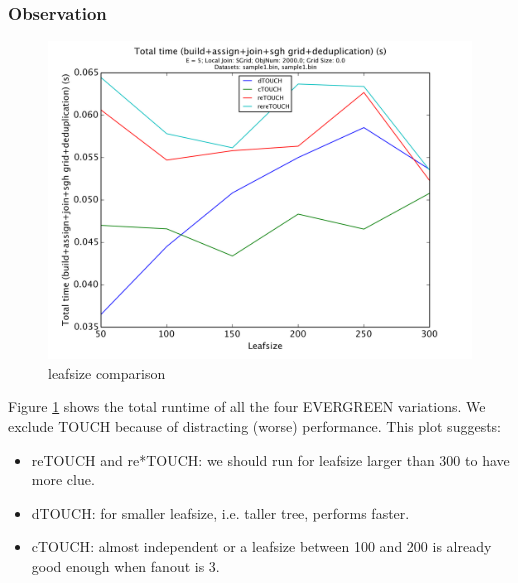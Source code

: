 \documentclass{sig-alternate}
\newcommand{\fref}[1]{Figure \ref{#1}}
\newcommand{\SJ}{TOUCH}
\newcommand{\newSJ}{EVERGREEN}
\newcommand{\dSJ}{dTOUCH}
\newcommand{\cSJ}{cTOUCH}
\newcommand{\reSJ}{reTOUCH}
\newcommand{\rereSJ}{re*TOUCH}
\begin{document}
\subsubsection{Observation}

\begin{figure}[htb]
    \begin{center}
        \includegraphics[width=\columnwidth]{leafsize/total}
        \caption{leafsize comparison}
        \label{fig:leafsize:time}
      \end{center}
\end{figure}

\fref{fig:leafsize:time} shows the total runtime of all the four {\newSJ} variations. We exclude {\SJ} because of distracting (worse) performance. This plot suggests:
\begin{itemize}
\item {\reSJ} and {\rereSJ}: we should run for leafsize larger than 300 to have more clue.
\item {\dSJ}: for smaller leafsize, i.e. taller tree, performs faster.
\item {\cSJ}: almost independent or a leafsize between 100 and 200 is already good enough when fanout is 3.
\end{itemize}
\end{document}
